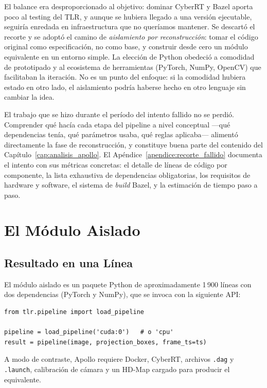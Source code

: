 El balance era desproporcionado al objetivo: dominar CyberRT y Bazel aporta poco al testing del TLR, y aunque se hubiera llegado a una versión ejecutable, seguiría enredada en infraestructura que no queríamos mantener. Se descartó el recorte y se adoptó el camino de \textit{aislamiento por reconstrucción}: tomar el código original como especificación, no como base, y construir desde cero un módulo equivalente en un entorno simple. La elección de Python obedeció a comodidad de prototipado y al ecosistema de herramientas (PyTorch, NumPy, OpenCV) que facilitaban la iteración. No es un punto del enfoque: si la comodidad hubiera estado en otro lado, el aislamiento podría haberse hecho en otro lenguaje sin cambiar la idea.

El trabajo que se hizo durante el período del intento fallido no se perdió. Comprender qué hacía cada etapa del pipeline a nivel conceptual ---qué dependencias tenía, qué parámetros usaba, qué reglas aplicaba--- alimentó directamente la fase de reconstrucción, y constituye buena parte del contenido del Capítulo~\ref{cap:analisis_apollo}. El Apéndice~\ref{apendice:recorte_fallido} documenta el intento con sus métricas concretas: el detalle de líneas de código por componente, la lista exhaustiva de dependencias obligatorias, los requisitos de hardware y software, el sistema de \textit{build} Bazel, y la estimación de tiempo paso a paso.

\section{El Módulo Aislado}
\label{sec:implementacion}

\subsection{Resultado en una Línea}

El módulo aislado es un paquete Python de aproximadamente 1\,900 líneas con dos dependencias (PyTorch y NumPy), que se invoca con la siguiente API:

\begin{codesnippet}
\begin{verbatim}
from tlr.pipeline import load_pipeline

pipeline = load_pipeline('cuda:0')   # o 'cpu'
result = pipeline(image, projection_boxes, frame_ts=ts)
\end{verbatim}
\end{codesnippet}

A modo de contraste, Apollo requiere Docker, CyberRT, archivos \texttt{.dag} y \texttt{.launch}, calibración de cámara y un HD-Map cargado para producir el equivalente.

